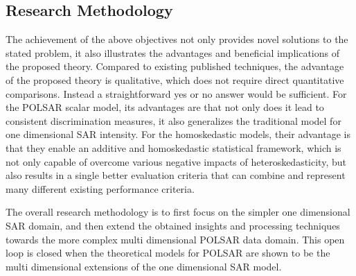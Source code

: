 \subsection{Research Methodology}
The
                achievement of the above objectives not only provides
                novel solutions to the stated problem, it also
                illustrates the advantages and beneficial implications
                of the proposed theory.
Compared
                to existing published techniques, the advantage of the
                proposed theory is qualitative, which does not require
                direct quantitative comparisons.
Instead
                a straightforward yes or no answer would be sufficient.
For
                the POLSAR scalar model, its advantages are that not
                only does it lead to consistent discrimination measures, it
                also generalizes the traditional model for one
                dimensional SAR intensity.
For
                the homoskedastic models, their advantage is that they
                enable an additive and homoskedastic statistical
                framework, which is not only capable of overcome various
                negative impacts of heteroskedasticity, but also results
                in a single better evaluation criteria that can combine
                and represent many different existing performance
                criteria.

The
                overall research methodology is to first focus on the
                simpler one dimensional SAR domain, and then extend the
                obtained insights and processing techniques 
towards the more complex multi dimensional
                POLSAR data domain.
This
                open loop is closed when the theoretical models for
                POLSAR are shown to be the multi dimensional extensions of
                the one dimensional SAR model.

